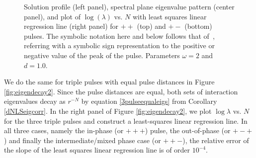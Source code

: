 \documentclass[12pt]{article}
\begin{document}
\begin{figure}[H]
\caption{Solution profile (left panel), spectral plane eigenvalue pattern (center panel), and plot of $\log(\lambda)$ vs. $N$ with least squares linear regression line (right panel) for $++$ (top) and $+-$ (bottom) pulses. The symbolic notation here and 
below follows that of~\cite{alfimov}, referring
with a symbolic sign representation to the positive
or negative value of the peak of the pulse.
Parameters $\omega = 2$ and $d = 1.0$.}
\label{fig:eigendecay1}
\end{figure}

We do the same for triple pulses with equal pulse distances in Figure \ref{fig:eigendecay2}. Since the pulse distances are equal, both sets of interaction eigenvalues decay as $r^{-N}$ by equation \eqref{3pulseequaleigs} from Corollary \ref{dNLSeigcorr}. In the right panel of Figure \ref{fig:eigendecay2}, we plot $\log \lambda$ vs. $N$ for the three triple pulses and construct a least-squares linear regression line. In all three cases, 
namely the in-phase (or $+++$) pulse, the 
out-of-phase (or $+-+$) and finally the 
intermediate/mixed phase case
(or $++-$), the relative error of the slope of the least squares linear regression line is of order $10^{-4}$. 
\end{document}
